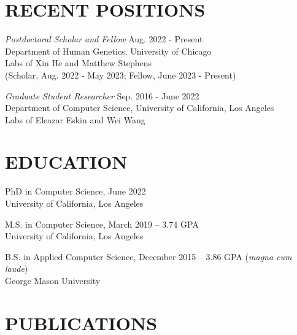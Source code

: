\documentclass[margin, 10pt]{res} %
\begin{document}
\begin{resume}


\section{RECENT POSITIONS}

{\sl Postdoctoral Scholar and Fellow} \hfill Aug. 2022 - Present \\ Department of Human Genetics, University of Chicago \\ Labs of Xin He and Matthew Stephens \\
(Scholar, Aug. 2022 - May 2023; Fellow, June 2023 - Present)

{\sl Graduate Student Researcher} \hfill Sep. 2016 - June 2022 \\ Department of Computer Science, University of California, Los Angeles \\ Labs of Eleazar Eskin and Wei Wang



\section{EDUCATION}

PhD in Computer Science, June 2022 \\
University of California, Los Angeles

M.S. in Computer Science, March 2019 -- 3.74 GPA \\
University of California, Los Angeles

B.S. in Applied Computer Science, December 2015 -- 3.86 GPA ({\sl magna cum laude}) \\
George Mason University
  

\section{PUBLICATIONS}


\end{resume}
\end{document}
